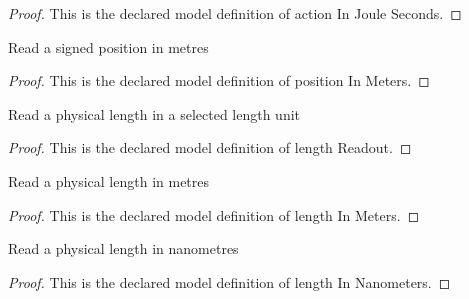 \begin{proof}
  This is the declared model definition of action In Joule Seconds.
\end{proof}
\begin{definition}
  \label{def:physics:phyx-mini-0570:phyxminiproblems-problemphyxmini0570-positioninmeters}
  Read a signed position in metres
\end{definition}
\begin{proof}
  This is the declared model definition of position In Meters.
\end{proof}
\begin{definition}
  \label{def:physics:phyx-mini-0570:phyxminiproblems-problemphyxmini0570-lengthreadout}
  Read a physical length in a selected length unit
\end{definition}
\begin{proof}
  This is the declared model definition of length Readout.
\end{proof}
\begin{definition}
  \label{def:physics:phyx-mini-0570:phyxminiproblems-problemphyxmini0570-lengthinmeters}
  Read a physical length in metres
\end{definition}
\begin{proof}
  This is the declared model definition of length In Meters.
\end{proof}
\begin{definition}
  \label{def:physics:phyx-mini-0570:phyxminiproblems-problemphyxmini0570-lengthinnanometers}
  Read a physical length in nanometres
\end{definition}
\begin{proof}
  This is the declared model definition of length In Nanometers.
\end{proof}
